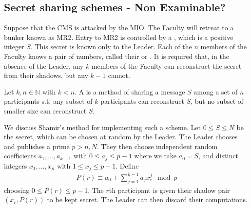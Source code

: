\subsection{Secret sharing schemes - Non Examinable?}
Suppose that the CMS is attacked by the MIO.
The Faculty will retreat to a bunker known as MR2.
Entry to MR2 is controlled by a , which is a positive integer $S$.
This secret is known only to the Leader.
Each of the $n$ members of the Faculty knows a pair of numbers, called their  or .
It is required that, in the absence of the Leader, any $k$ members of the Faculty can reconstruct the secret from their shadows, but any $k-1$ cannot.
\begin{definition}
    Let $k, n \in \mathbb N$ with $k < n$.
    A  is a method of sharing a message $S$ among a set of $n$ participants s.t. any subset of $k$ participants can reconstruct $S$, but no subset of smaller size can reconstruct $S$.
\end{definition}
We discuss Shamir's method for implementing such a scheme.
Let $0 \leq S \leq N$ be the secret, which can be chosen at random by the Leader.
The Leader chooses and publishes a prime $p > n, N$.
They then choose independent random coefficients $a_1, \dots, a_{k-1}$ with $0 \leq a_j \leq p-1$ where we take $a_0 = S$, and distinct integers $x_1, \dots, x_n$ with $1 \leq x_j \leq p-1$.
Define
\begin{align*}
    P(r) \equiv a_0 + \sum_{j=1}^{k-1} a_j x_r^j \mod p
\end{align*}
choosing $0 \leq P(r) \leq p-1$.
The $r$th participant is given their shadow pair $(x_r, P(r))$ to be kept secret.
The Leader can then discard their computations.

